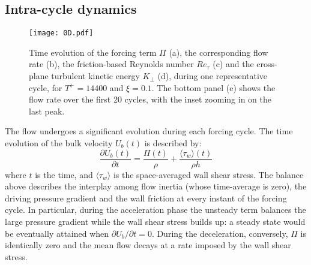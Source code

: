 \documentclass[lineno]{jfm}
\begin{document}
\subsection{Intra-cycle dynamics}

\begin{figure}
\centering
\texttt{[image: 0D.pdf]}
\caption{Time evolution of the forcing term $\Pi$ (a), the corresponding flow rate (b), the friction-based Reynolds number $Re_\tau$ (c) and the cross-plane turbulent kinetic energy $K_\perp$ (d), during one representative cycle, for $T^+=14400$ and $\xi=0.1$. The bottom panel (e) shows the flow rate over the first 20 cycles, with the inset zooming in on the last peak.}
\label{fig:0D}
\end{figure}

The flow undergoes a significant evolution during each forcing cycle.  
The time evolution of the bulk velocity $U_b(t)$ is described by:
\begin{equation}
\frac{\partial U_b(t)}{\partial t}=\frac{\Pi(t)}{\rho}+\frac{\langle \tau_w \rangle(t)}{\rho h}
\label{eq:meanflow}
\end{equation}
where $t$ is the time, and $\langle \tau_w \rangle$ is the space-averaged wall shear stress. 
The balance above describes the interplay among flow inertia (whose time-average is zero), the driving pressure gradient and the wall friction at every instant of the forcing cycle.
In particular, during the acceleration phase the unsteady term balances the large pressure gradient while the wall shear stress builds up: a steady state would be eventually attained when ${\partial U_b}/{\partial t}=0$. 
During the deceleration, conversely, $\Pi$ is identically zero and the mean flow decays at a rate imposed by the wall shear stress.
\end{document}
